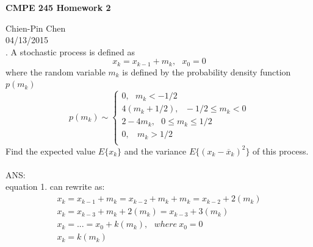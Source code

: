 \documentclass{article}
\begin{document}
 
\begin{center}
{\bf \Large  CMPE 245 Homework 2} \\
\end{center}
Chien-Pin Chen\\
04/13/2015\\

. A stochastic process is defined as
\begin{equation}
 x_{k}=x_{k-1}+m_k,\ \ \ x_{0}=0
\end{equation}
where the random variable $m_k$ is defined by the probability density function $p(m_k)$
\begin{equation}
  p(m_{k}) \sim \left\{
    \begin{array}{l}
       0, \ \ \ m_k < -1/2 \\
       4(m_k+1/2), \ \ \ -1/2 \le m_k < 0 \\
       2-4m_k, \ \ \ 0 \le  m_k \le 1/2 \\
       0, \ \ \ \ m_k > 1/2 \\
    \end{array} \right.
\end{equation}
Find the expected value $E\{x_k\}$ and 
the variance $E\{(x_k-\overline{x}_k)^2\}$ of this process.\\ \\
ANS:\\
equation 1. can rewrite as:
\begin{equation}
	\begin{array}{l}
 		x_{k}=x_{k-1}+m_k=x_{k-2}+m_k+m_k=x_{k-2}+2(m_k)\\
 		x_{k}=x_{k-3}+m_k+2(m_k)=x_{k-3}+3(m_k)\\
 		x_{k}=...=x_{0}+k(m_k), \ \ \ where\ x_{0}=0\\
 		x_{k}=k(m_k)
	\end{array}
\end{equation}
\end{document}
